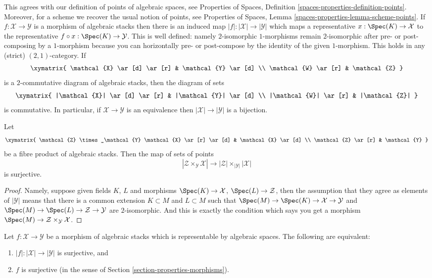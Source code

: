 \noindent
This agrees with our definition of points of algebraic spaces, see
Properties of Spaces, Definition \ref{spaces-properties-definition-points}.
Moreover, for a scheme we recover the usual notion of points, see
Properties of Spaces, Lemma \ref{spaces-properties-lemma-scheme-points}.
If $f : \mathcal{X} \to \mathcal{Y}$ is a morphism of algebraic stacks
then there is an induced map $|f| : |\mathcal{X}| \to |\mathcal{Y}|$ which
maps a representative $x : \Spec(K) \to \mathcal{X}$ to the
representative $f \circ x : \Spec(K) \to \mathcal{Y}$. This is
well defined: namely $2$-isomorphic $1$-morphisms remain $2$-isomorphic after
pre- or post-composing by a $1$-morphism because you can horizontally
pre- or post-compose by the identity of the given $1$-morphism. This holds
in any (strict) $(2, 1)$-category. If
$$
\xymatrix{
\mathcal{X} \ar[d] \ar[r] & \mathcal{Y} \ar[d] \\
\mathcal{W} \ar[r] & \mathcal{Z}
}
$$
is a $2$-commutative diagram of algebraic stacks, then the diagram
of sets
$$
\xymatrix{
|\mathcal{X}| \ar[d] \ar[r] & |\mathcal{Y}| \ar[d] \\
|\mathcal{W}| \ar[r] & |\mathcal{Z}|
}
$$
is commutative.
In particular, if $\mathcal{X} \to \mathcal{Y}$ is an equivalence
then $|\mathcal{X}| \to |\mathcal{Y}|$ is a bijection.

\begin{lemma}
\label{lemma-points-cartesian}
Let
$$
\xymatrix{
\mathcal{Z} \times_\mathcal{Y} \mathcal{X} \ar[r] \ar[d] &
\mathcal{X} \ar[d] \\
\mathcal{Z} \ar[r] & \mathcal{Y}
}
$$
be a fibre product of algebraic stacks. Then the map of sets
of points
$$
|\mathcal{Z} \times_\mathcal{Y} \mathcal{X}|
\longrightarrow
|\mathcal{Z}| \times_{|\mathcal{Y}|} |\mathcal{X}|
$$
is surjective.
\end{lemma}

\begin{proof}
Namely, suppose given fields $K$, $L$ and morphisms
$\Spec(K) \to \mathcal{X}$, $\Spec(L) \to \mathcal{Z}$,
then the assumption that they agree as elements of $|\mathcal{Y}|$ means that
there is a common extension $K \subset M$ and $L \subset M$
such that
$\Spec(M) \to \Spec(K) \to \mathcal{X} \to \mathcal{Y}$ and
$\Spec(M) \to \Spec(L) \to \mathcal{Z} \to \mathcal{Y}$
are $2$-isomorphic. And this is exactly the condition which says you get a
morphism $\Spec(M) \to \mathcal{Z} \times_\mathcal{Y} \mathcal{X}$.
\end{proof}

\begin{lemma}
\label{lemma-characterize-surjective}
Let $f : \mathcal{X} \to \mathcal{Y}$ be a morphism of algebraic stacks
which is representable by algebraic spaces. The following are equivalent:
\begin{enumerate}
\item $|f| : |\mathcal{X}| \to |\mathcal{Y}|$ is surjective, and
\item $f$ is surjective
(in the sense of Section \ref{section-properties-morphisms}).
\end{enumerate}
\end{lemma}

